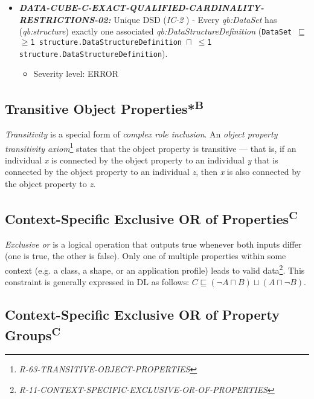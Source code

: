 \documentclass{llncs}
\newcommand{\ms}[1]{\texttt{#1}}
\begin{document}
\begin{itemize}
	\item \textbf{{\em DATA-CUBE-C-EXACT-QUALIFIED-CARDINALITY-RESTRICTIONS-02:}}
	Unique DSD (\emph{IC-2} \cite{CyganiakReynolds2014}) -  
	Every \emph{qb:DataSet} has (\emph{qb:structure}) exactly one associated \emph{qb:DataStructureDefinition} (\ms{DataSet $\sqsubseteq$ $\geq$1 structure.DataStructureDefinition $\sqcap$ $\leq$1 structure.DataStructureDefinition}). 
	\begin{itemize}
		\item Severity level: ERROR
	\end{itemize}
\end{itemize}

\subsection{Transitive Object Properties*\textsuperscript{B}}

\emph{Transitivity} is a special form of \emph{complex role inclusion}.
An \emph{object property transitivity axiom}\footnote{\emph{R-63-TRANSITIVE-OBJECT-PROPERTIES}} states that the object property is transitive — that is, if an individual \emph{x} is connected by the object property to an individual \emph{y} that is connected by the object property to an individual \emph{z}, then \emph{x} is also connected by the object property to \emph{z}.

\subsection{Context-Specific Exclusive OR of Properties\textsuperscript{C}}		

\emph{Exclusive or} is a logical operation that outputs true whenever both inputs differ (one is true, the other is false).
Only one of multiple properties within some context (e.g. a class, a shape, or an  application profile) leads to valid data\footnote{\emph{R-11-CONTEXT-SPECIFIC-EXCLUSIVE-OR-OF-PROPERTIES}}.
This constraint is generally expressed in DL as follows: \ms{$C \sqsubseteq (\neg A \sqcap B) \sqcup (A \sqcap \neg B)$}.

\subsection{Context-Specific Exclusive OR of Property Groups\textsuperscript{C}}
\end{document}
